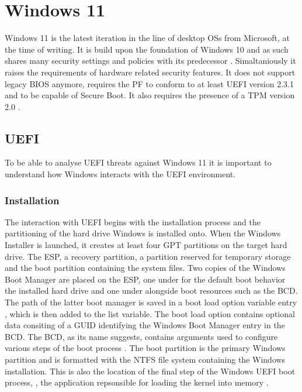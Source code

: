 

\chapter{Windows 11}
\label{sec:windows}

Windows 11 is the latest iteration in the line of desktop \acp{OS} from Microsoft, at the time of writing.
It is build upon the foundation of Windows 10 and as such shares many security settings and policies with its predecessor \cite{microsoft-windows-11-overview}.
Simaltaniously it raises the requirements of hardware related security features.
It does not support legacy \ac{BIOS} anymore, requires the \ac{PF} to conform to at least \ac{UEFI} version 2.3.1 and to be capable of Secure Boot.
It also requires the presence of a \ac{TPM} version 2.0 \cite{microsoft-windows-minimum-hardware-requirements-overview}.

\section{\acs{UEFI}}

To be able to analyse \ac{UEFI} threats against Windows 11 it is important to understand how Windows interacts with the \ac{UEFI} environment.

\subsection{Installation}

The interaction with \ac{UEFI} begins with the installation process and the partitioning of the hard drive Windows is installed onto.
When the Windows Installer is launched, it creates at least four \ac{GPT} partitions on the target hard drive.
The \acf{ESP}, a recovery partition, a partition reserved for temporary storage and the boot partition containing the system files.
Two copies of the Windows Boot Manager  are placed on the \ac{ESP}, one under  for the default boot behavior the installed hard drive and one under  alongside boot resources such as the \ac{BCD}.
The path of the latter boot manager is saved in a boot load option variable entry , which is then added to the  list variable.
The boot load option contains optional data consiting of a GUID identifying the Windows Boot Manager entry in the \ac{BCD}.
The \ac{BCD}, as its name suggests, contains arguments used to configure various steps of the boot process \cite[Section 12]{windows-internals-7-part2}.
The boot partition is the primary Windows partition and is formatted with the \ac{NTFS} file system containing the Windows installation.
This is also the location of the final step of the Windows UEFI boot process, , the application repsonsible for loading the kernel into memory \cite[12. The Windows OS Loader]{windows-internals-7-part2}.

